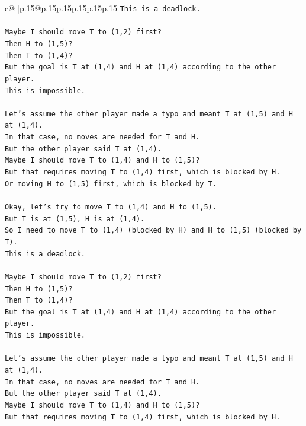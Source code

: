\documentclass{article}
\begin{document}
{\begin{supertabular}{c@{$\;$}|p{.15\linewidth}@{}p{.15\linewidth}p{.15\linewidth}p{.15\linewidth}p{.15\linewidth}p{.15\linewidth}}
{{{\texttt{This is a deadlock.} \\
\\ 
\texttt{Maybe I should move T to (1,2) first?} \\
\texttt{Then H to (1,5)?} \\
\texttt{Then T to (1,4)?} \\
\texttt{But the goal is T at (1,4) and H at (1,4) according to the other player.} \\
\texttt{This is impossible.} \\
\\ 
\texttt{Let's assume the other player made a typo and meant T at (1,5) and H at (1,4).} \\
\texttt{In that case, no moves are needed for T and H.} \\
\texttt{But the other player said T at (1,4).} \\
\texttt{Maybe I should move T to (1,4) and H to (1,5)?} \\
\texttt{But that requires moving T to (1,4) first, which is blocked by H.} \\
\texttt{Or moving H to (1,5) first, which is blocked by T.} \\
\\ 
\texttt{Okay, let's try to move T to (1,4) and H to (1,5).} \\
\texttt{But T is at (1,5), H is at (1,4).} \\
\texttt{So I need to move T to (1,4) (blocked by H) and H to (1,5) (blocked by T).} \\
\texttt{This is a deadlock.} \\
\\ 
\texttt{Maybe I should move T to (1,2) first?} \\
\texttt{Then H to (1,5)?} \\
\texttt{Then T to (1,4)?} \\
\texttt{But the goal is T at (1,4) and H at (1,4) according to the other player.} \\
\texttt{This is impossible.} \\
\\ 
\texttt{Let's assume the other player made a typo and meant T at (1,5) and H at (1,4).} \\
\texttt{In that case, no moves are needed for T and H.} \\
\texttt{But the other player said T at (1,4).} \\
\texttt{Maybe I should move T to (1,4) and H to (1,5)?} \\
\texttt{But that requires moving T to (1,4) first, which is blocked by H.} \\
}}}
\end{supertabular}}
\end{document}
